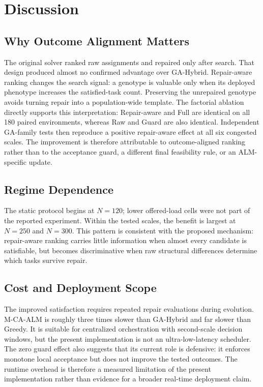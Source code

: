 \section{Discussion}

\subsection{Why Outcome Alignment Matters}
The original solver ranked raw assignments and repaired only after search. That design produced almost no confirmed advantage over GA-Hybrid. Repair-aware ranking changes the search signal: a genotype is valuable only when its deployed phenotype increases the satisfied-task count. Preserving the unrepaired genotype avoids turning repair into a population-wide template. The factorial ablation directly supports this interpretation: Repair-aware and Full are identical on all 180 paired environments, whereas Raw and Guard are also identical. Independent GA-family tests then reproduce a positive repair-aware effect at all six congested scales. The improvement is therefore attributable to outcome-aligned ranking rather than to the acceptance guard, a different final feasibility rule, or an ALM-specific update.

\subsection{Regime Dependence}
The static protocol begins at $N=120$; lower offered-load cells were not
part of the reported experiment. Within the tested scales, the benefit is largest at $N=250$ and 
$N=300$. This pattern is consistent with the proposed mechanism: 
repair-aware ranking carries little information when almost every candidate 
is satisfiable, but becomes discriminative when raw structural differences 
determine which tasks survive repair.

\subsection{Cost and Deployment Scope}
The improved satisfaction requires repeated repair evaluations during evolution. M-CA-ALM is roughly three times slower than GA-Hybrid and far slower than Greedy. It is suitable for centralized orchestration with second-scale decision windows, but the present implementation is not an ultra-low-latency scheduler. The zero guard effect also suggests that its current role is defensive: it enforces monotone local acceptance but does not improve the tested outcomes. The runtime overhead is therefore a measured limitation of the present implementation rather than evidence for a broader real-time deployment claim.


